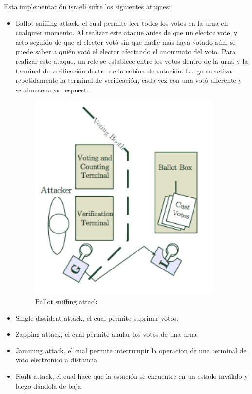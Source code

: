 Esta implementación israelí sufre los siguientes ataques:
\begin{itemize}
	\item Ballot sniffing attack, el cual permite leer todos los votos en la urna en cualquier momento. Al realizar este ataque antes de que un elector vote, y acto seguido de que el elector votó sin que nadie más haya votado aún, se puede saber a quién votó el elector afectando el anonimato del voto.
Para realizar este ataque, un relé se establece entre los votos dentro de la urna y la terminal de verificación dentro de la cabina de votación. Luego se activa repetidamente la terminal de verificación, cada vez con una votó diferente y se almacena su respuesta
\begin{figure}[h!]
\includegraphics{Imagenes/privacidad3}
\caption{Ballot sniffing attack}
\end{figure}
	\item Single dissident attack, el cual permite suprimir votos.

	\item Zapping attack, el cual permite anular los votos de una urna

	\item Jamming attack, el cual permite interrumpir la operacion de una terminal de voto electronico a distancia

	\item Fault attack, el cual hace que la estación se encuentre en un estado inválido y luego dándola de baja

\end{itemize}

